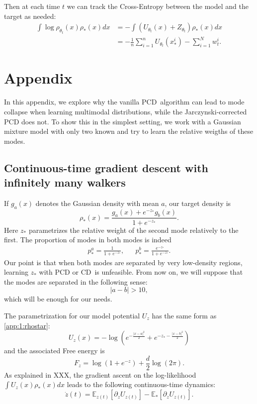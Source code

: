 \documentclass[a4paper,11pt]{extarticle}
\begin{document}
Then at each time $t$ we can track the Cross-Entropy between the model and the target as needed: 
\begin{align}\int \log \rho_{\theta_t}(x) \rho_*(x)dx &= -\int (U_{\theta_t}(x) + Z_{\theta_t})\rho_*(x)dx \\
    &= - \frac{1}{n}\sum_{i=1}^n U_{\theta_t}(x^i_*) - \sum_{i=1}^{N}w^i_t.
\end{align}


\newcommand{\E}{\mathbb{E}}
\newcommand{\PP}{\mathbb{P}}

\section{Appendix}

In this appendix, we explore why the vanilla PCD algorithm can lead to mode collapse when learning multimodal distributions, while the Jarczynski-corrected PCD does not. To show this in the simplest setting, we work with a Gaussian mixture model with only two known and try to learn the relative weigths of these modes. 

\subsection{Continuous-time gradient descent with infinitely many walkers}

If $g_a(x)$ denotes the Gaussian density with mean $a$, our target density is
\begin{equation}\label{app:1:rhostar}
    \rho_*(x) = \frac{g_a(x) + e^{-z_*}g_b(x)}{1+e^{-z_*}}.
\end{equation}
Here $z_*$ parametrizes the relative weight of the second mode relatively to the first. The proportion of modes in both modes is indeed 
\begin{align}p_*^a = \frac{1}{1 + e^{-z_*}},&& p^b_* = \frac{e^{-z_*}}{1+e^{-z_*}}.\end{align}
Our point is that when both modes are separated by very low-density regions, learning $z_*$ with PCD or CD is unfeasible. From now on, we will suppose that the modes are separated in the following sense: 
\begin{equation}\label{app:sepmodes}
    |a-b|>10, 
\end{equation}
which will be enough for our needs. 

The parametrization for our model potential $U_z$ has the same form as  \eqref{app:1:rhostar}: 
\begin{equation}
    U_z(x) = -\log\left(e^{-\frac{|x-a|^2}{2}} + e^{-z_* - \frac{|x-b|^2}{2}}\right) 
\end{equation}
and the associated Free energy is 
\begin{equation}
    F_z = \log(1 + e^{-z}) + \frac{d}{2}\log(2\pi).
\end{equation}
As explained in XXX, the gradient ascent on the log-likelihood $\int U_z(x)\rho_*(x)dx$ leads to the following continuous-time dynamics:  
\begin{equation}\label{app:dyn}
    \dot{z}(t) = \E_{z(t)}[\partial_z U_{z(t)}] - \E_*[\partial_z U_{z(t)}].
\end{equation}
\end{document}
